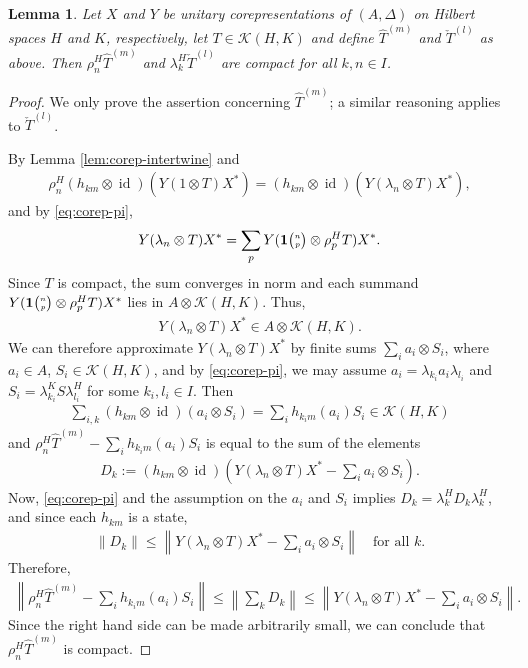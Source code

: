 \documentclass[11pt]{article}
\DeclareMathOperator{\id}{id}
\newcommand{\Grt}[3]{#1{\tiny {\begin{pmatrix} #2\\#3\end{pmatrix}}}}
\newcommand{\UnitC}[2]{\Grt{\mathbf{1}}{#1}{#2}}
\newtheorem{Lem}[Theorem]{Lemma}
\theoremstyle{definition}
\numberwithin{equation}{section}
\begin{document}
\begin{Lem} \label{lem:intertwiner-compact} Let $X$ and $Y$ be unitary corepresentations of
  $(A,\Delta)$ on Hilbert spaces $H$ and $K$, respectively, let $T \in \mathcal{K}(H,K)$ and define
  $\hat T^{(m)}$ and $\check T^{(l)}$ as above. Then $\rho^{H}_{n}\hat T^{(m)}$ and
  $\lambda^{H}_{k}\check T^{(l)}$ are compact for all $k,n\in I$.
\end{Lem}
\begin{proof}
  We only prove the assertion concerning $\hat T^{(m)}$; a similar reasoning applies to $\check
  T^{(l)}$.

By Lemma \ref{lem:corep-intertwine} and
  \begin{align*}
    \rho^{H}_{n}(h_{km} \otimes \id)(Y(1\otimes T)X^{*}) = 
    (h_{km} \otimes \id)(Y(\lambda_{n} \otimes T)X^{*}),
  \end{align*}
and  by \eqref{eq:corep-pi}, 
\begin{align*}
    Y(\lambda_{n} \otimes T)X^{*} =  \sum_{p} Y(\UnitC{n}{p} \otimes \rho^{H}_{p}T)X^{*}.
  \end{align*}
  Since $T$ is compact, the sum converges in norm and each summand $Y(\UnitC{n}{p} \otimes
  \rho^{H}_{p}T)X^{*}$ lies in $A \otimes \mathcal{K}(H,K)$. Thus,
  \begin{align*}
    Y(\lambda_{n} \otimes T)X^{*} \in A \otimes \mathcal{K}(H,K).
  \end{align*}
 We can therefore approximate $Y(\lambda_{n}
  \otimes T)X^{*}$ by finite sums $\sum_{i} a_{i} \otimes S_{i}$,
  where $a_{i} \in A$, $S_{i} \in \mathcal{K}(H,K)$, and by
  \eqref{eq:corep-pi}, we may assume $a_{i}=\lambda_{k_{i}}a_{i}
  \lambda_{l_{i}}$ and $S_{i}=\lambda_{k_{i}}^{K}S\lambda_{l_{i}}^{H}$
  for some $k_{i},l_{i}\in I$. Then
  \begin{align*}
\sum_{i,k}    (h_{km} \otimes \id)(a_{i} \otimes S_{i}) = \sum_{i}
h_{k_{i}m}(a_{i})S_{i} \in \mathcal{K}(H,K)
  \end{align*}
and  $  \rho^{H}_{n}\hat T^{(m)} - \sum_{i}
h_{k_{i}m}(a_{i})S_{i}$ is equal to the sum of the elements
\begin{align*}
  D_{k}:=   (h_{km} \otimes \id)\left(Y(\lambda_{n} \otimes T)X^{*} -
    \sum_{i}a_{i} \otimes S_{i}\right).
\end{align*}
Now, \eqref{eq:corep-pi} and the assumption on the $a_{i}$ and $S_{i}$
implies $D_{k} = \lambda_{k}^{H}D_{k}\lambda_{k}^{H}$, and  since each $h_{km}$ is a state,
\begin{align*}
  \|D_{k}\| \leq \left\|Y(\lambda_{n} \otimes T)X^{*} -
    \sum_{i}a_{i} \otimes S_{i}\right\| \quad\text{for all } k.
\end{align*}
Therefore, 
\begin{align*}
\left\|    \rho^{H}_{n}\hat T^{(m)} - \sum_{i}
h_{k_{i}m}(a_{i})S_{i}\right\| \leq \left\|\sum_{k} D_{k}\right\| \leq \left\|Y(\lambda_{n} \otimes T)X^{*} -
    \sum_{i}a_{i} \otimes S_{i}\right\|.
\end{align*}
Since the right hand side can be made arbitrarily small, we can
conclude that $\rho^{H}_{n}\hat T^{(m)}$ is compact. 
\end{proof}
\end{document}
